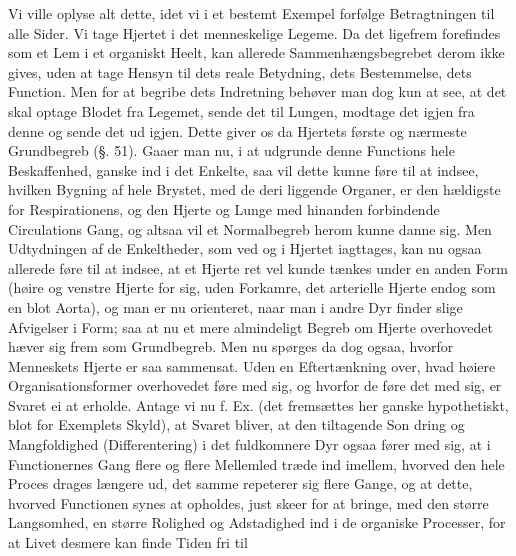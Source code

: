 \documentclass[12pt]{book}
\def\textit#1{#1}%
\newcommand{\opage}[1]{\marginnote{\footnotesize\textit{[#1]}}}
\begin{document}
Vi ville oplyse alt dette, idet vi i et bestemt Exempel forfølge Betragtningen til alle
Sider. Vi tage Hjertet i det menneskelige Legeme. Da det ligefrem forefindes som et Lem i
et organiskt Heelt, kan allerede Sammenhængsbegrebet derom ikke gives, uden at tage Hensyn
\opage{129} til dets reale Betydning, dets Bestemmelse, dets Function. Men for at begribe dets
Indretning behøver man dog kun at see, at det skal optage Blodet fra Legemet, sende det
til Lungen, modtage det igjen fra denne og sende det ud igjen. Dette giver os da Hjertets
første og nærmeste Grundbegreb (§. 51). Gaaer man nu, i at udgrunde denne Functions hele
Beskaffenhed, ganske ind i det Enkelte, saa vil dette kunne føre til at indsee, hvilken
Bygning af hele Brystet, med de deri liggende Organer, er den hældigste for
Respirationens, og den Hjerte og Lunge med hinanden forbindende Circulations Gang, og
altsaa vil et Normalbegreb herom kunne danne sig. Men Udtydningen af de Enkeltheder, som
ved og i Hjertet iagttages, kan nu ogsaa allerede føre til at indsee, at et Hjerte ret vel
kunde tænkes under en anden Form (høire og venstre Hjerte for sig, uden Forkamre, det
arterielle Hjerte endog som en blot Aorta), og man er nu orienteret, naar man i andre Dyr
finder slige Afvigelser i Form; saa at nu et mere almindeligt Begreb om Hjerte overhovedet
hæver sig frem som Grundbegreb. Men nu spørges da dog ogsaa, hvorfor Menneskets Hjerte er
saa sammensat. Uden en Eftertænkning over, hvad høiere Organisationsformer overhovedet
føre med sig, og hvorfor de føre det med sig, er Svaret ei at erholde. Antage vi nu f. Ex.
(det fremsættes her ganske hypothetiskt, blot for Exemplets Skyld), at Svaret bliver, at
den tiltagende Son%
\opage{130}dring og Mangfoldighed (Differentering) i det fuldkomnere Dyr ogsaa fører med sig, at i
Functionernes Gang flere og flere Mellemled træde ind imellem, hvorved den hele Proces
drages længere ud, det samme repeterer sig flere Gange, og at dette, hvorved Functionen
synes at opholdes, just skeer for at bringe, med den større Langsomhed, en større Rolighed
og Adstadighed ind i de organiske Processer, for at Livet desmere kan finde Tiden fri til
\end{document}
